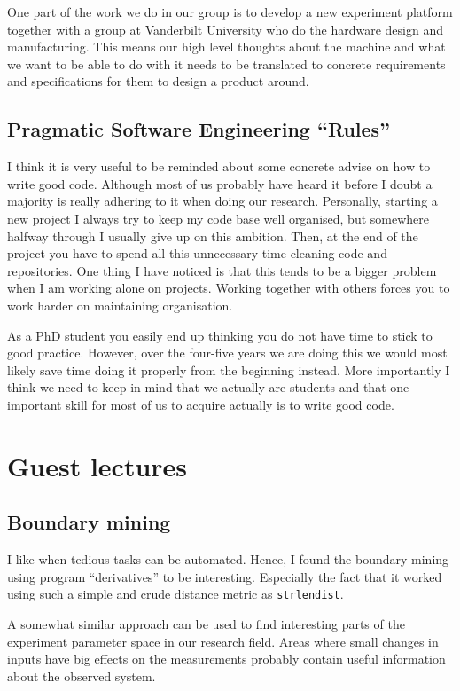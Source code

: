 \documentclass[11pt]{article}
\begin{document}
One part of the work we do in our group is to develop a new experiment platform together with a group at Vanderbilt University who do the hardware design and manufacturing. This means our high level thoughts about the machine and what we want to be able to do with it needs to be translated to concrete requirements and specifications for them to design a product around.

\subsection*{Pragmatic Software Engineering ``Rules''}
I think it is very useful to be reminded about some concrete advise on how to write good code. Although most of us probably have heard it before I doubt a majority is really adhering to it when doing our research. Personally, starting a new project I always try to keep my code base well organised, but somewhere halfway through I usually give up on this ambition. Then, at the end of the project you have to spend all this unnecessary time cleaning code and repositories. One thing I have noticed is that this tends to be a bigger problem when I am working alone on projects. Working together with others forces you to work harder on maintaining organisation.

As a PhD student you easily end up thinking you do not have time to stick to good practice. However, over the four-five years we are doing this we would most likely save time doing it properly from the beginning instead. More importantly I think we need to keep in mind that we actually are students and that one important skill for most of us to acquire actually is to write good code.

\section*{Guest lectures}
\subsection*{Boundary mining}
I like when tedious tasks can be automated. Hence, I found the boundary mining using program ``derivatives'' to be interesting. Especially the fact that it worked using such a simple and crude distance metric as \texttt{strlendist}.

A somewhat similar approach can be used to find interesting parts of the experiment parameter space in our research field. Areas where small changes in inputs have big effects on the measurements probably contain useful information about the observed system.
\end{document}
